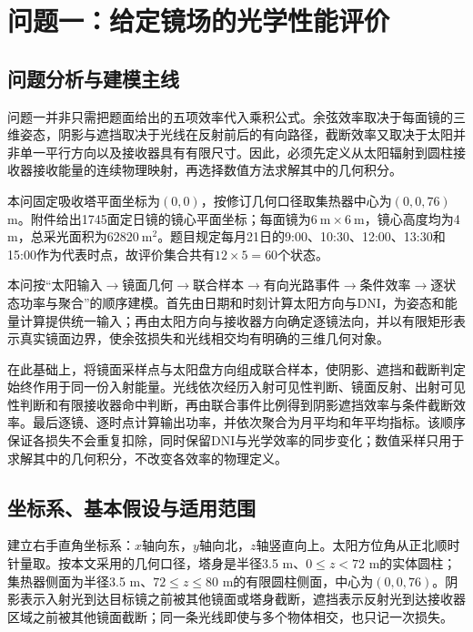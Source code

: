 \section{问题一：给定镜场的光学性能评价}

\subsection{问题分析与建模主线}

问题一并非只需把题面给出的五项效率代入乘积公式。余弦效率取决于每面镜的三维姿态，阴影与遮挡取决于光线在反射前后的有向路径，截断效率又取决于太阳并非单一平行方向以及接收器具有有限尺寸。因此，必须先定义从太阳辐射到圆柱接收器接收能量的连续物理映射，再选择数值方法求解其中的几何积分。

本问固定吸收塔平面坐标为$(0,0)$，按修订几何口径取集热器中心为$(0,0,76)$ m。附件给出1745面定日镜的镜心平面坐标；每面镜为$6\ \mathrm{m}\times6\ \mathrm{m}$，镜心高度均为4 m，总采光面积为$62820\ \mathrm{m^2}$。题目规定每月21日的9:00、10:30、12:00、13:30和15:00作为代表时点，故评价集合共有$12\times5=60$个状态。

本问按“太阳输入$\rightarrow$镜面几何$\rightarrow$联合样本$\rightarrow$有向光路事件$\rightarrow$条件效率$\rightarrow$逐状态功率与聚合”的顺序建模。首先由日期和时刻计算太阳方向与DNI，为姿态和能量计算提供统一输入；再由太阳方向与接收器方向确定逐镜法向，并以有限矩形表示真实镜面边界，使余弦损失和光线相交均有明确的三维几何对象。

在此基础上，将镜面采样点与太阳盘方向组成联合样本，使阴影、遮挡和截断判定始终作用于同一份入射能量。光线依次经历入射可见性判断、镜面反射、出射可见性判断和有限接收器命中判断，再由联合事件比例得到阴影遮挡效率与条件截断效率。最后逐镜、逐时点计算输出功率，并依次聚合为月平均和年平均指标。该顺序保证各损失不会重复扣除，同时保留DNI与光学效率的同步变化；数值采样只用于求解其中的几何积分，不改变各效率的物理定义。

\subsection{坐标系、基本假设与适用范围}

建立右手直角坐标系：$x$轴向东，$y$轴向北，$z$轴竖直向上。太阳方位角从正北顺时针量取。按本文采用的几何口径，塔身是半径3.5 m、$0\le z<72$ m的实体圆柱；集热器侧面为半径3.5 m、$72\le z\le80$ m的有限圆柱侧面，中心为$(0,0,76)$。阴影表示入射光到达目标镜之前被其他镜面或塔身截断，遮挡表示反射光到达接收器区域之前被其他镜面截断；同一条光线即使与多个物体相交，也只记一次损失。

